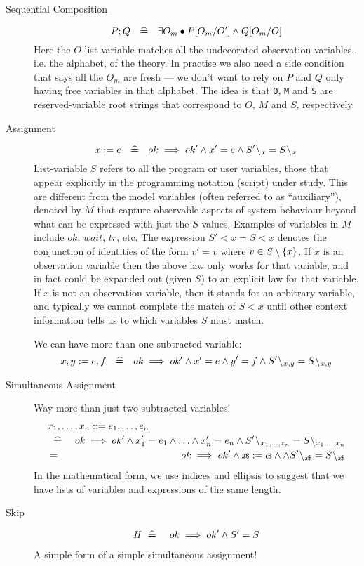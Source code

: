 \begin{description}
%
\item[Sequential Composition]
$$
  P ; Q ~\mathrel{~\widehat{=\!\!\!\!=}}~~ \exists O_m \bullet P[O_m/O'] \land Q[O_m/O]
$$
Here the $O$ list-variable matches all the undecorated
observation variables., i.e. the alphabet, of the theory.
In practise we also need a side condition that says all the $O_m$
are fresh --- we don't want to rely on $P$ and $Q$ only having free variables
in that alphabet.
The idea is that \texttt{O}, \texttt{M} and \texttt{S} are reserved-variable root strings that
correspond to $O$, $M$ and $S$, respectively.
%
\item[Assignment]
$$
  x := e ~\defs~ ok \implies ok' \land x' = e
    \land S'\less x = S\less x
$$
List-variable $S$ refers to all the program or user variables,
those that appear explicitly in the programming notation (script) under study.
This are different from the model variables (often referred to as
``auxiliary''), denoted by $M$ that capture observable aspects
of system behaviour beyond what can be expressed with just the $S$
values. Examples of variables in $M$ include $ok$, $wait$, $tr$, etc.
The expression $S'\less x = S\less x$
denotes the conjunction of identities of the form $v'=v$
where $v \in S\setminus\{{x}\}$.
If $x$ is an observation variable
then the above law only works for that variable,
and in fact could be expanded out (given $S$)
to an explicit law for that variable.
If $x$ is not an observation variable,
then it stands for an arbitrary variable,
and typically we cannot complete the match of $S\less x$
until
other context information tells us to which variables $S$ must match.
\par
We can have more than one subtracted variable:
$$
  x,y := e,f ~\defs~ ok \implies ok' \land x' = e \land y'=f
    \land S'\less{x,y} = S\less{x,y}
$$
\item[Simultaneous Assignment]
Way more than just two subtracted variables!
\begin{eqnarray*}
  \lefteqn{x_1,\ldots,x_n ::= e_1, \ldots , e_n}
\\ &\defs&
     ok \implies ok'
     \land x'_1 = e_1 \land \ldots \land x'_n = e_n
     \land S'\less{x_1,\ldots,x_n} = S\less{x_1,\ldots,x_n}
\\ &=& ok \implies ok'
    \land \lst x := \lst e \land
     \land S'\less{\lst x} = S\less{\lst x}
\end{eqnarray*}
In the mathematical form, we use indices and ellipsis
to suggest that we have lists of variables and expressions
of the same length.
\item[Skip]
\begin{eqnarray*}
  \mathit{I\!I} &\mathrel{~\widehat{=\!\!\!\!=}}~& ok \implies ok' \land S'=S
\end{eqnarray*}
A simple form of a simple simultaneous assignment!
\end{description}

